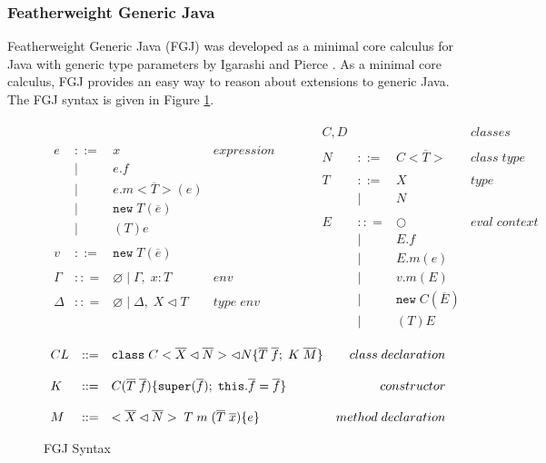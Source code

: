 \documentclass[11pt
              , a4paper
              , twoside
              , openright
              ]{report}
\numberwithin{case}{theorem}
\numberwithin{subcase}{case}
\begin{document}
\subsubsection{Featherweight Generic Java}
Featherweight Generic Java (FGJ) was developed as a minimal core calculus for Java with generic type parameters by Igarashi and Pierce \cite{Igarashi:2001:FJM:503502.503505}. As a minimal core calculus, FGJ provides an easy way to reason about extensions to generic Java. The FGJ syntax is given in Figure \ref{f:fgj_syntax}. 
\begin{figure}[h]
\[
\begin{array}{lll}
\begin{array}{lllr}
e & ::= & x & expression \\
& | & e.f &\\
& | & e.m<\overline{T}>(e) &\\
& | & \texttt{new} \; T(\overline{e})&\\
& | & (T) e &\\
&&\\
v & ::= & \texttt{new} \; T(\overline{e})&\\
&&\\
\Gamma & :: = & \varnothing \; | \; \Gamma,\; x : T & env \\
&&\\
\Delta & :: = & \varnothing \; | \; \Delta,\; X \lhd T & type \; env \\
 \end{array}
& ~~~~~~
&
\begin{array}{lllr}
C, D &  &  & classes \\
&&\\
N & ::= & C <\overline{T}> & class \; type\\
&&\\
T & ::= & X & type \\
       & | & N\\
&&\\
E & :: = & \bigcirc & eval \; context\\
       & | & E.f\\
       & | & E.m(e)\\
       & | & v.m(E)\\
	   & | & \texttt{new} \; C(\overline{E})\\
       & | & (T)E\\
\end{array}
\end{array}
\]
\[
\begin{array}{lllr}
CL & ::= & \verb|class| \; C <\overline{X} \lhd \overline{N}> \lhd N \{\overline{T} \; \overline{f}; \; K \; \overline{M}\}  & class \; declaration\\
$$\\
K & ::= & C(\overline{T}\; \overline{f})\{\verb|super|(\overline{f}); \; \verb|this|.\overline{f} = \overline{f}\}  & constructor\\
$$\\
M & ::= & <\overline{X} \lhd \overline{N}> \; T \; m \; (\overline{T}\; \overline{x})\{e\}  & method \; declaration\\
\end{array}
\]
\caption{FGJ Syntax}
\label{f:fgj_syntax}
\end{figure}
\end{document}

